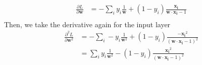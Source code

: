 \documentclass[12pt]{article}
\begin{document}
\begin{enumerate}
\begin{equation}
      \begin{split}
        \frac{\partial L}{\partial \boldsymbol{w}}&=
          -\sum_{i}y_i\frac{1}{\boldsymbol{w}}
          +(1-y_i)\frac{\boldsymbol{x_i}}
                       {\boldsymbol{w}\cdot\boldsymbol{x_i}-1}\\
      \end{split}
    \end{equation}
    Then, we take the derivative again for the input layer
    \begin{equation}
      \begin{split}
        \frac{\partial^2 L}{\partial \boldsymbol{w}^2}&=
          -\sum_{i}-y_i\frac{1}{\boldsymbol{w}^2}
          +(1-y_i)\frac{-\boldsymbol{x_i}^2}
                       {(\boldsymbol{w}\cdot\boldsymbol{x_i}-1)^2}\\
          &=\sum_{i}y_i\frac{1}{\boldsymbol{w}^2}
          -(1-y_i)\frac{\boldsymbol{x_i}^2}
                       {(\boldsymbol{w}\cdot\boldsymbol{x_i}-1)^2}\\
      \end{split}
    \end{equation}
\end{enumerate}
\end{document}
